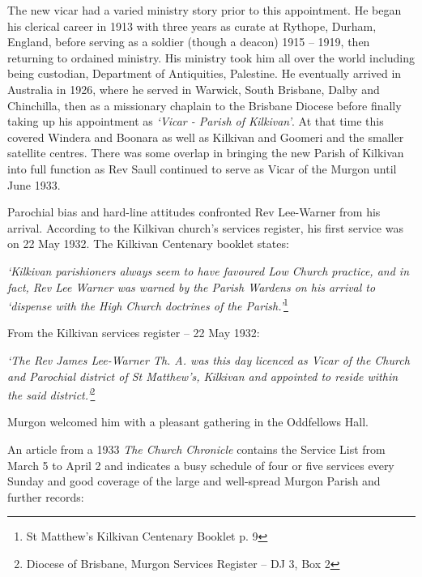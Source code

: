 The new vicar had a varied ministry story prior to this appointment. He began his clerical career in 1913 with three years as curate at Rythope, Durham, England, before serving as a soldier (though a deacon) 1915 -- 1919, then returning to ordained ministry. His ministry took him all over the world including being custodian, Department of Antiquities, Palestine. He eventually arrived in Australia in 1926, where he served in Warwick, South Brisbane, Dalby and Chinchilla, then as a missionary chaplain to the Brisbane Diocese before finally taking up his appointment as \emph{`Vicar - Parish of Kilkivan'}. At that time this covered Windera and Boonara as well as Kilkivan and Goomeri and the smaller satellite centres. There was some overlap in bringing the new Parish of Kilkivan into full function as Rev Saull continued to serve as Vicar of the Murgon until June 1933.



Parochial bias and hard-line attitudes confronted Rev Lee-Warner from his arrival. According to the Kilkivan church's services register, his first service was on 22 May 1932. The Kilkivan Centenary booklet states:



\emph{`Kilkivan parishioners always seem to have favoured Low Church practice, and in fact, Rev Lee Warner was warned by the Parish Wardens on his arrival to `dispense with the High Church doctrines of the Parish.'}\footnote{St Matthew's Kilkivan Centenary Booklet p. 9}


From the Kilkivan services register -- 22 May 1932:



\emph{`The Rev James Lee-Warner Th. A. was this day licenced as Vicar of the Church and Parochial district of St Matthew's, Kilkivan and appointed to reside within the said district.'}\footnote{Diocese of Brisbane, Murgon Services Register -- DJ 3, Box 2}


Murgon welcomed him with a pleasant gathering in the Oddfellows Hall.



An article from a 1933 \emph{The Church Chronicle} contains the Service List from March 5 to April 2 and indicates a busy schedule of four or five services every Sunday and good coverage of the large and well-spread Murgon Parish and further records:



